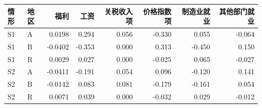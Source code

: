 \begin{tabular}{llrrrrrr}
\toprule
情形 & 地区 & 福利 & 工资 & 关税收入项 & 价格指数项 & 制造业就业 & 其他部门就业 \\
\midrule
S1 & A & 0.0198 & 0.294 & 0.056 & -0.330 & 0.055 & -0.064 \\
S1 & B & -0.0402 & -0.353 & 0.000 & 0.313 & -0.450 & 0.150 \\
S1 & R & 0.0029 & 0.027 & 0.000 & -0.025 & 0.065 & -0.027 \\
\midrule
S2 & A & -0.0411 & -0.191 & 0.054 & 0.096 & -0.120 & 0.141 \\
S2 & B & -0.0142 & 0.083 & 0.081 & -0.179 & -0.161 & 0.054 \\
S2 & R & 0.0071 & 0.039 & 0.000 & -0.032 & 0.029 & -0.012 \\
\bottomrule
\end{tabular}
